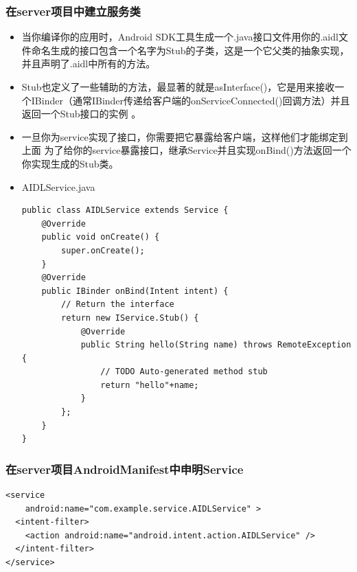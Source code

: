 \documentclass[9pt, b5paper]{article}
\begin{document}
\subsubsection{在server项目中建立服务类}
\label{sec-17-4-2}
\begin{itemize}
\item 当你编译你的应用时，Android SDK工具生成一个.java接口文件用你的.aidl文件命名生成的接口包含一个名字为Stub的子类，这是一个它父类的抽象实现，并且声明了.aidl中所有的方法。
\item Stub也定义了一些辅助的方法，最显著的就是asInterface()，它是用来接收一个IBinder（通常IBinder传递给客户端的onServiceConnected()回调方法）并且返回一个Stub接口的实例 。
\item 一旦你为service实现了接口，你需要把它暴露给客户端，这样他们才能绑定到上面 为了给你的service暴露接口，继承Service并且实现onBind()方法返回一个你实现生成的Stub类。
\item AIDLService.java
\begin{verbatim}
public class AIDLService extends Service {
    @Override
    public void onCreate() {
        super.onCreate();
    }
    @Override
    public IBinder onBind(Intent intent) {
        // Return the interface
        return new IService.Stub() {
            @Override
            public String hello(String name) throws RemoteException {
                // TODO Auto-generated method stub
                return "hello"+name;
            }
        };
    }
}
\end{verbatim}
\end{itemize}
\subsubsection{在server项目AndroidManifest中申明Service}
\label{sec-17-4-3}
\begin{verbatim}
<service 
    android:name="com.example.service.AIDLService" >
  <intent-filter>  
    <action android:name="android.intent.action.AIDLService" />  
  </intent-filter> 
</service>
\end{verbatim}
\end{document}
